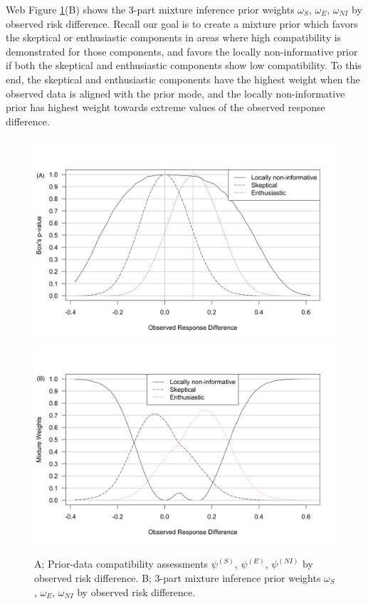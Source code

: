 \documentclass[AMA,STIX1COL,doublespace]{WileyNJD-v2}
\begin{document}
Web Figure \ref{fig:3-part-compatibility}(B) shows the 3-part mixture inference prior weights $\omega_S$, $\omega_{E}$, $\omega_{NI}$ by observed risk difference.
%
Recall our goal is to create a mixture prior which favors the skeptical or enthusiastic components in areas where high compatibility is demonstrated for those components, and favors the locally non-informative prior if both the skeptical and enthusiastic components show low compatibility.
%
To this end, the skeptical and enthusiastic components have the highest weight when the observed data is aligned with the prior mode, and the locally non-informative prior has highest weight towards extreme values of the observed response difference.
\begin{figure}\begin{center}
\includegraphics[width=6in]{3-part-compatibility-1.png}
\includegraphics[width=6in]{3-part-compatibility-2.png}
    \caption{A; Prior-data compatibility assessments $\psi^{(S)}$, $\psi^{(E)}$, $\psi^{(NI)}$ by observed risk difference. B; 3-part mixture inference prior weights $\omega_S$, $\omega_{E}$, $\omega_{NI}$ by observed risk difference.}
\label{fig:3-part-compatibility}
 \end{center}
\end{figure}
\end{document}
